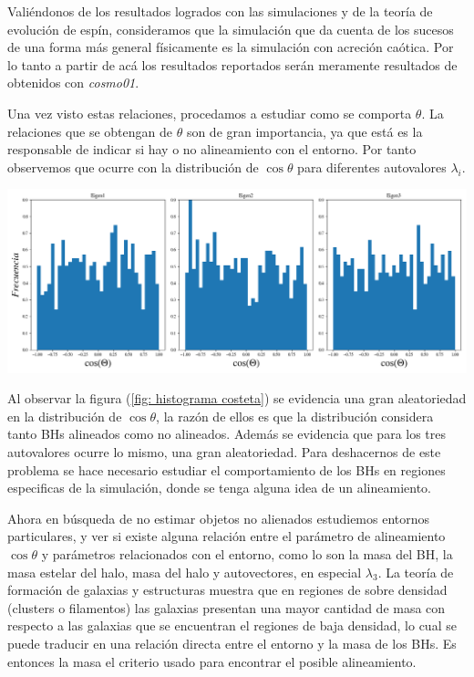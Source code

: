 Valiéndonos de los resultados logrados con las simulaciones y de la teoría de evolución de espín, consideramos que la simulación que da cuenta de los sucesos de una forma más general físicamente es la simulación con acreción caótica. Por lo tanto a partir de acá los resultados reportados serán meramente resultados de obtenidos con {\it{cosmo01}}. 




Una vez visto estas relaciones, procedamos a estudiar como se comporta $\theta$. La relaciones que se obtengan de $\theta$ son de gran importancia, ya que está es la responsable de indicar si hay o no alineamiento con el entorno. Por tanto observemos que ocurre con la distribución de $\cos \theta$ para diferentes autovalores $\lambda_{i}$.
%
\begin{center}
\includegraphics[scale=.37]{./figures/6_Resultados/cosmo01/histograma_cos_theta.png}
\label{fig: histograma costeta}
\end{center}
%
Al observar la figura (\ref{fig: histograma costeta}) se evidencia una gran aleatoriedad en la distribución de $\cos\theta$, la razón de ellos es que la distribución considera tanto BHs alineados como no alineados. Además se evidencia que para los tres autovalores ocurre lo mismo, una gran aleatoriedad. Para deshacernos de este problema se hace necesario estudiar el comportamiento de los BHs en regiones especificas de la simulación, donde se tenga alguna idea de un alineamiento.  

Ahora en búsqueda de no estimar objetos no alienados estudiemos entornos particulares, y ver si existe alguna relación entre el parámetro de alineamiento $\cos\theta$ y parámetros relacionados con el entorno, como lo son la masa del BH, la masa estelar del halo, masa del halo y autovectores, en especial $\lambda_{3}$. La teoría de formación de galaxias y estructuras muestra que en regiones de sobre densidad (clusters o filamentos) las galaxias presentan una mayor cantidad de masa  con respecto a las galaxias que se encuentran el regiones de baja densidad, lo cual se puede traducir en una relación directa entre el entorno y la masa de los BHs. Es entonces la masa el criterio usado para encontrar el posible alineamiento. 

